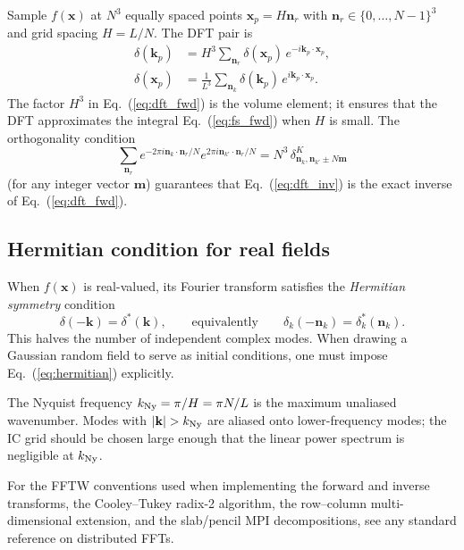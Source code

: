 \documentclass[12pt]{article}
\newcommand{\bx}{\mathbf{x}}
\newcommand{\bk}{\mathbf{k}}
\begin{document}
Sample $f(\bx)$ at $N^3$ equally spaced points $\bx_p = H\mathbf{n}_r$
with $\mathbf{n}_r\in\{0,\ldots,N-1\}^3$ and grid spacing $H = L/N$.
The DFT pair is
%
\begin{align}
  \delta(\bk_p) &= H^3 \sum_{\mathbf{n}_r}
      \delta(\bx_p)\,e^{-i\bk_p\cdot\bx_p},
  \label{eq:dft_fwd}\\
  \delta(\bx_p) &= \frac{1}{L^3}\sum_{\mathbf{n}_k}
      \delta(\bk_p)\,e^{i\bk_p\cdot\bx_p}.
  \label{eq:dft_inv}
\end{align}
%
The factor $H^3$ in Eq.~(\ref{eq:dft_fwd}) is the volume element; it
ensures that the DFT approximates the integral
Eq.~(\ref{eq:fs_fwd}) when $H$ is small.  The orthogonality condition
%
\begin{equation}
  \sum_{\mathbf{n}_r}
    e^{-2\pi i\mathbf{n}_k\cdot\mathbf{n}_r/N}
    e^{2\pi i\mathbf{n}_{k'}\cdot\mathbf{n}_r/N}
    = N^3\,\delta^K_{\mathbf{n}_k,\mathbf{n}_{k'}\pm N\mathbf{m}}
  \label{eq:dft_orth}
\end{equation}
%
(for any integer vector $\mathbf{m}$) guarantees that
Eq.~(\ref{eq:dft_inv}) is the exact inverse of Eq.~(\ref{eq:dft_fwd}).

\subsection{Hermitian condition for real fields}
\label{app:fft_hermitian}

When $f(\bx)$ is real-valued, its Fourier transform satisfies the
\emph{Hermitian symmetry} condition
%
\begin{equation}
  \delta(-\bk) = \delta^*(\bk),
  \qquad\text{equivalently}\qquad
  \delta_k(-\mathbf{n}_k) = \delta_k^*(\mathbf{n}_k).
  \label{eq:hermitian}
\end{equation}
%
This halves the number of independent complex modes.  When drawing
a Gaussian random field to serve as initial conditions, one must
impose Eq.~(\ref{eq:hermitian}) explicitly.

The Nyquist frequency $k_{\rm Ny} = \pi/H = \pi N/L$ is the maximum
unaliased wavenumber.  Modes with $|\bk| > k_{\rm Ny}$ are aliased
onto lower-frequency modes; the IC grid should be chosen large enough
that the linear power spectrum is negligible at $k_{\rm Ny}$.

For the FFTW conventions used when implementing the forward and
inverse transforms, the Cooley--Tukey radix-2 algorithm, the
row--column multi-dimensional extension, and the slab/pencil MPI
decompositions, see any standard reference on distributed FFTs.
\end{document}
